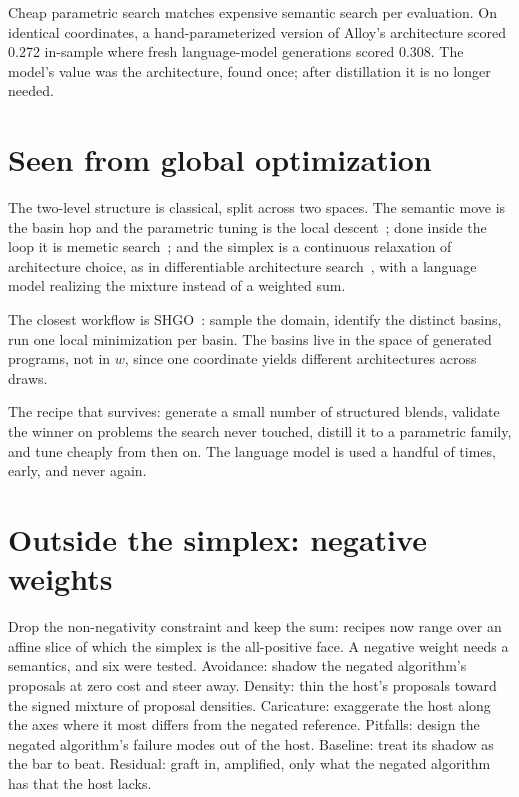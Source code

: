 \documentclass[11pt]{article}
\begin{document}
Cheap parametric search matches expensive semantic search per evaluation.
On identical coordinates, a hand-parameterized version of Alloy's
architecture scored 0.272 in-sample where fresh language-model generations
scored 0.308. The model's value was the architecture, found once; after
distillation it is no longer needed.

\section{Seen from global optimization}

The two-level structure is classical, split across two spaces. The semantic
move is the basin hop and the parametric tuning is the local
descent~\cite{wales1997}; done inside the loop it is memetic
search~\cite{moscato1989}; and the simplex is a continuous relaxation of
architecture choice, as in differentiable architecture
search~\cite{liu2019darts}, with a language model realizing the mixture
instead of a weighted sum.

The closest workflow is SHGO~\cite{endres2018}: sample the domain, identify
the distinct basins, run one local minimization per basin. The basins live
in the space of generated programs, not in $w$, since one coordinate yields
different architectures across draws.

The recipe that survives: generate a small number of structured blends,
validate the winner on problems the search never touched, distill it to a
parametric family, and tune cheaply from then on. The language model is
used a handful of times, early, and never again.

\section{Outside the simplex: negative weights}
\label{sec:outside}

Drop the non-negativity constraint and keep the sum: recipes now range over
an affine slice of which the simplex is the all-positive face. A negative
weight needs a semantics, and six were tested. Avoidance: shadow the
negated algorithm's proposals at zero cost and steer away. Density: thin
the host's proposals toward the signed mixture of proposal densities.
Caricature: exaggerate the host along the axes where it most differs from
the negated reference. Pitfalls: design the negated algorithm's failure
modes out of the host. Baseline: treat its shadow as the bar to beat.
Residual: graft in, amplified, only what the negated algorithm has that the
host lacks.
\end{document}
